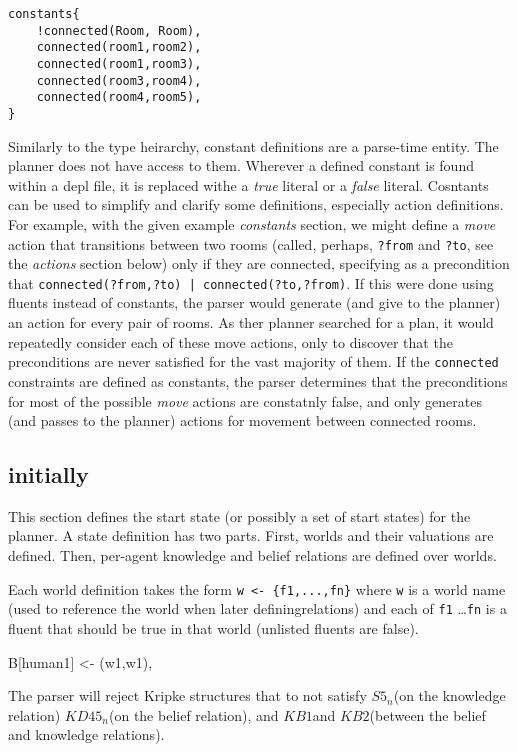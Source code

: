 \documentclass{article}
\newcommand{\kdff}{\ensuremath{KD45_n}}
\newcommand{\sfive}{\ensuremath{S5_n}}
\newcommand{\kbone}{\ensuremath{KB1}}
\newcommand{\kbtwo}{\ensuremath{KB2}}
\begin{document}
\begin{verbatim}
constants{
    !connected(Room, Room),
    connected(room1,room2),
    connected(room1,room3),
    connected(room3,room4),
    connected(room4,room5),
}
\end{verbatim}

Similarly to the type heirarchy, constant definitions are a parse-time entity.
The planner does not have access to them.
Wherever a defined constant is found within a depl file, it is replaced withe a
\emph{true} literal or a
\emph{false} literal.  Cosntants can be used to simplify and clarify some definitions,
especially action definitions. For example, with the given example
\emph{constants} section, we might define a \emph{move} action that transitions
between two rooms (called, perhaps, \verb|?from| and \verb|?to|, see the
\emph{actions} section below) only if they are connected, specifying as a
precondition that \verb"connected(?from,?to) | connected(?to,?from)".  If this
were done using fluents instead of constants,
the parser would generate (and give to the planner) an
action for every pair of rooms. As ther planner searched for a plan, it
would repeatedly consider each of these move actions, only to discover that the
preconditions are never satisfied for the vast majority of them. If
the \verb|connected| constraints are defined as constants, the parser determines that
the preconditions for most of the possible \emph{move} actions are constatnly
false, and only generates (and passes to the planner) actions for movement
between connected rooms.



\subsection{initially}

This section defines the start state (or possibly a set of start states) for the planner.
A state definition has two parts. First, worlds and their valuations are
defined. Then, per-agent knowledge and belief relations are defined over worlds.



Each world definition takes the form
\verb|w <- {f1,...,fn}|
where \verb|w| is a world name (used to reference the world when later
definingrelations) and each of \verb|f1| \ldots \verb|fn| is a fluent 
that should be true in that world (unlisted fluents are false).

B[human1] <- {(w1,w1)},

The parser will reject Kripke structures that to not satisfy \sfive (on the
knowledge relation) \kdff (on the belief relation), and
\kbone and \kbtwo (between the belief and knowledge relations).
\end{document}
